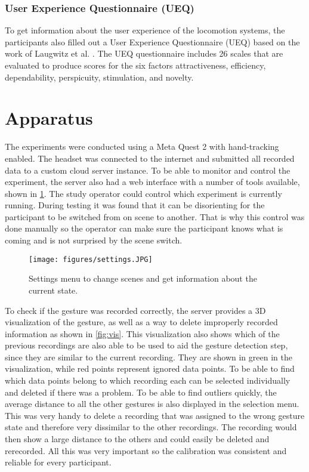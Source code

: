 \subsubsection{User Experience Questionnaire (UEQ)}
To get information about the user experience of the locomotion systems, the participants also filled out a User Experience Questionnaire (UEQ) based on the work of Laugwitz et al. \cite{Laugwitz2008}. The UEQ questionnaire includes 26 scales that are evaluated to produce scores for the six factors attractiveness, efficiency, dependability, perspicuity, stimulation, and novelty.

\section{Apparatus}
The experiments were conducted using a Meta Quest 2 with hand-tracking enabled. The headset was connected to the internet and submitted all recorded data to a custom cloud server instance. To be able to monitor and control the experiment, the server also had a web interface with a number of tools available, shown in \ref{fig:settings}. The study operator could control which experiment is currently running. During testing it was found that it can be disorienting for the participant to be switched from on scene to another. That is why this control was done manually so the operator can make sure the participant knows what is coming and is not surprised by the scene switch.

\begin{figure}[!ht]
    \centering
    \texttt{[image: figures/settings.JPG]}
    \caption{Settings menu to change scenes and get information about the current state.}
    \label{fig:settings}
\end{figure}

To check if the gesture was recorded correctly, the server provides a 3D visualization of the gesture, as well as a way to delete improperly recorded information as shown in \ref{fig:vis}. This visualization also shows which of the previous recordings are also able to be used to aid the gesture detection step, since they are similar to the current recording. They are shown in green in the visualization, while red points represent ignored data points. To be able to find which data points belong to which recording each can be selected individually and deleted if there was a problem. To be able to find outliers quickly, the average distance to all the other gestures is also displayed in the selection menu. This was very handy to delete a recording that was assigned to the wrong gesture state and therefore very dissimilar to the other recordings. The recording would then show a large distance to the others and could easily be deleted and rerecorded. All this was very important so the calibration was consistent and reliable for every participant.

